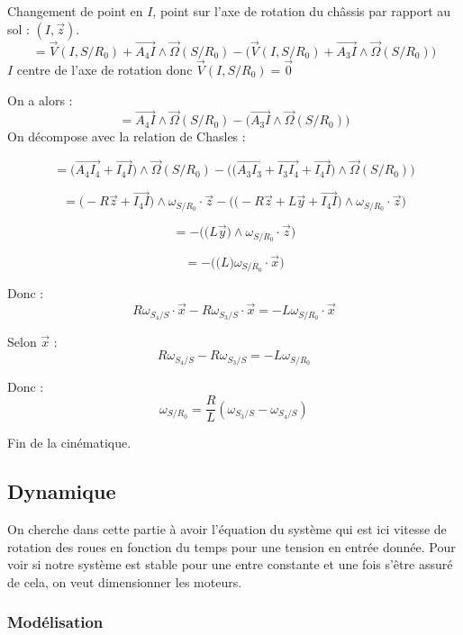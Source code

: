 \documentclass[a4paper,12pt]{report}  %
\begin{document}
Changement de point en $I$, point sur l'axe de rotation du châssis par rapport au sol : $(I,\vec{z})$. 
$$= 
\vec{V}(I, S/R_0) + \overrightarrow{A_4 I} \wedge \vec{\Omega}(S/R_0) 
- \bigg(\vec{V}(I, S/R_0) + \overrightarrow{A_3 I} \wedge \vec{\Omega}(S/R_0) \bigg)
$$
$I$ centre de l'axe de rotation donc $\vec{V}(I, S/R_0) = \vec0$

On a alors : 
$$
= \overrightarrow{A_4 I} \wedge \vec{\Omega}(S/R_0) 
- \bigg( \overrightarrow{A_3 I} \wedge \vec{\Omega}(S/R_0) \bigg)$$
On décompose avec la relation de Chasles : 

$$
= \bigg(\overrightarrow{A_4 I_4}+\overrightarrow{I_4 I} \bigg)
\wedge \vec{\Omega}(S/R_0) 
- \Bigg( 
\bigg(
\overrightarrow{A_3 I_3} 
+ \overrightarrow{I_3 I_4} 
+ \overrightarrow{I_4 I}
\bigg) 
\wedge \vec{\Omega}(S/R_0) 
\Bigg)
$$

$$
= \bigg( -R\vec{z}+\overrightarrow{I_4 I} \bigg)
\wedge {\omega}_{S/R_0} \cdot \vec{z} 
- 
\Bigg( 
\bigg( 
-R\vec{z} + L\vec{y} +\overrightarrow{I_4I}
\bigg) 
\wedge {\omega}_{S/R_0} \cdot \vec{z}  
\Bigg)
$$

$$
= - \Bigg( 
\bigg( 
L\vec{y} 
\bigg) 
\wedge {\omega}_{S/R_0} \cdot \vec{z}  
\Bigg)
$$

$$
= - \Bigg( 
\bigg( 
L
\bigg) 
{\omega}_{S/R_0}
\cdot \vec{x}
\Bigg)
$$

Donc : 
$$
R\omega_{S_4/S} \cdot \vec{x} - R\omega_{S_3/S} \cdot \vec{x}
= -L {\omega}_{S/R_0} \cdot \vec{x}
$$

Selon $\vec{x}$ : 
$$
R\omega_{S_4/S} - R\omega_{S_3/S} 
= -L {\omega}_{S/R_0} 
$$

Donc : 
$$
\boxed{
	{\omega}_{S/R_0}
	= \frac{R}{L} (\omega_{S_3/S} - \omega_{S_4/S} )
}
$$

Fin de la cinématique. 

\subsection{Dynamique} 

On cherche dans cette partie à avoir l'équation du système qui est ici vitesse de rotation des roues en fonction du temps pour une tension en entrée donnée. Pour voir si notre système est stable pour une entre constante et une fois s'être assuré de cela, on veut dimensionner les moteurs. 

\subsubsection{Modélisation} 
\end{document}
